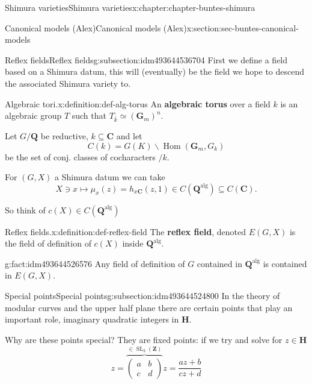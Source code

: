 \documentclass[oneside,10pt,]{book}
\newcommand{\terminology}[1]{\textbf{#1}}
\numberwithin{equation}{section}
\newcommand{\ZZ}{\mathbf{Z}}
\newcommand{\QQ}{\mathbf{Q}}
\newcommand{\CC}{\mathbf{C}}
\newcommand{\alg}{\mathrm{alg}}
\DeclareMathOperator{\Hom}{Hom}
\DeclareMathOperator{\SL}{SL}
\newcommand{\amp}{&}
\begin{document}
\begin{chapterptx}{Shimura varieties}{}{Shimura varieties}{}{}{x:chapter:chapter-buntes-shimura}
\begin{sectionptx}{Canonical models (Alex)}{}{Canonical models (Alex)}{}{}{x:section:sec-buntes-canonical-models}
%
\begin{subsectionptx}{Reflex fields}{}{Reflex fields}{}{}{g:subsection:idm493644536704}
First we define a field based on a Shimura datum, this will (eventually) be the field we hope to descend the associated Shimura variety to.%
\begin{definition}{Algebraic tori.}{x:definition:def-alg-torus}%
An \terminology{algebraic torus} over a field  \(k \) is an algebraic group \(T\) such that \(T_{\bar k} \simeq (\mathbf G_m)^n\).%
\end{definition}
Let \(G/\QQ\) be reductive, \(k \subseteq \CC\) and let%
\begin{equation*}
C(k) = G(K) \backslash \Hom(\mathbf G_m, G_k)
\end{equation*}
be the set of conj. classes of cocharacters \(/k\).%
\par
For \((G,X)\) a Shimura datum we can take%
\begin{equation*}
X \ni x \mapsto \mu_x(z) = h_{x\CC} (z,1) \in C(\QQ^\alg) \subseteq C(\CC)\text{.}
\end{equation*}
%
\par
So think of \(c(X) \in C(\QQ^\alg)\)%
\begin{definition}{Reflex fields.}{x:definition:def-reflex-field}%
The \terminology{reflex field}, denoted \(E(G,X)\) is the field of definition of \(c(X)\) inside \(\QQ^\alg\).%
\end{definition}
\begin{fact}{}{}{g:fact:idm493644526576}%
Any field of definition of \(G\) contained in \(\QQ^\alg\) is contained in \(E(G,X)\).%
\end{fact}
\end{subsectionptx}
%
%
\typeout{************************************************}
\typeout{************************************************}
%
\begin{subsectionptx}{Special points}{}{Special points}{}{}{g:subsection:idm493644524800}
In the theory of modular curves and the upper half plane there are certain points that play an important role, imaginary quadratic integers in \(\mathbf H\).%
\par
Why are these points special? They are fixed points: if we try and solve for \(z \in \mathbf H\)%
\begin{equation*}
z=  \overbrace{\begin{pmatrix} a\amp b \\ c \amp d\end{pmatrix}}^{\in \SL_2(\ZZ)} z = \frac{az + b}{cz+d}

\end{equation*}
\end{subsectionptx}
\end{sectionptx}
\end{chapterptx}
\end{document}
